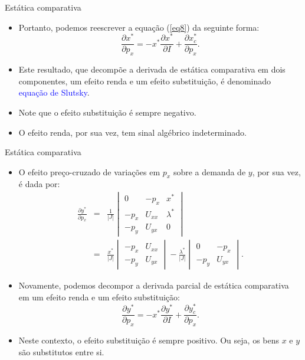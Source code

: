 \documentclass[10pt]{beamer}
\begin{document}
\begin{frame}{Estática comparativa}
    \begin{itemize}
        \item Portanto, podemos reescrever a equação (\ref{eq8}) da seguinte forma:
        \begin{equation}
            \frac{\partial x^*}{\partial p_x} = -x^*\frac{\partial x^*}{\partial I} + \frac{\partial x_c^*}{\partial p_x}.
            \label{slutsky}
        \end{equation}
        \bigskip
        \item Este resultado, que decompõe a derivada de estática comparativa em dois componentes, um efeito renda e um efeito substituição, é denominado \textcolor{blue}{equação de Slutsky}.
        \bigskip
        \item Note que o efeito substituição é sempre negativo.
        \bigskip
        \item O efeito renda, por sua vez, tem sinal algébrico indeterminado.
    \end{itemize}
\end{frame}

\begin{frame}{Estática comparativa}
    \begin{itemize}
        \item O efeito preço-cruzado de variações em $p_x$ sobre a demanda de $y$, por sua vez, é dada por:
    \begin{eqnarray}
    \frac{\partial y^*}{\partial p_x} &=& \frac{1}{|J|}\begin{vmatrix}
    0 & -p_x & x^* \\
    -p_x & U_{xx} & \lambda^* \\
    -p_y & U_{yx} & 0
    \end{vmatrix} \nonumber \\
    &=& \frac{x^*}{|J|}\begin{vmatrix}
    -p_x & U_{xx} \\ -p_y & U_{yx}
    \end{vmatrix} - \frac{\lambda^*}{|J|}\begin{vmatrix}
    0 & -p_x \\ -p_y & U_{yx}
    \end{vmatrix}.
    \end{eqnarray}
    \bigskip
    \item Novamente, podemos decompor a derivada parcial de estática comparativa em um efeito renda e um efeito substituição:
    \begin{equation}
        \frac{\partial y^*}{\partial p_x} = -x^*\frac{\partial y^*}{\partial I} + \frac{\partial y_c^*}{\partial p_x}.
    \end{equation}
    \bigskip
    \item Neste contexto, o efeito substituição é sempre positivo. Ou seja, os bens $x$ e $y$ são substitutos entre si.
    \end{itemize}
\end{frame}
\end{document}
